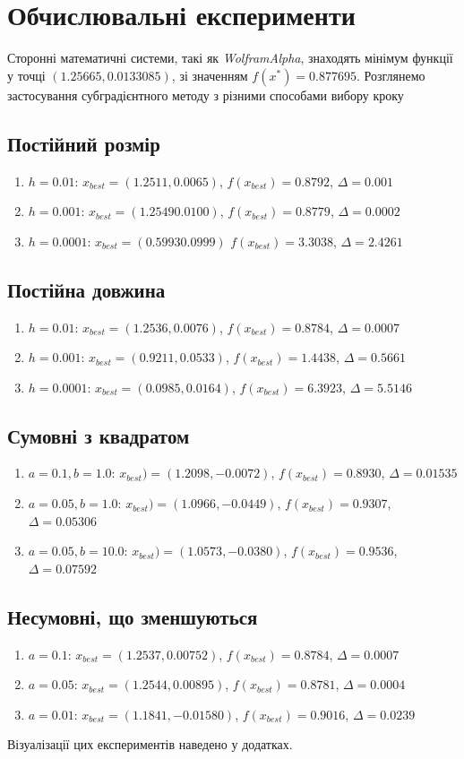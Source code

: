 \documentclass[a4paper, 14pt]{extarticle}
\begin{document}
\section{Обчислювальні експерименти}
Сторонні математичні системи, такі як \emph{WolframAlpha},
знаходять мінімум функції у точці $(1.25665, 0.0133085)$,
зі значенням $f(x^\ast) = 0.877695$.
Розглянемо застосування субградієнтного методу з різними 
способами вибору кроку 
\subsection{Постійний розмір}
\begin{enumerate}
    \item $h=0.01$:  $x_{best} = (1.2511, 0.0065)$, $f(x_{best})=0.8792$, $\varDelta = 0.001$
    \item $h=0.001$: $x_{best} = (1.2549 0.0100)$,  $f(x_{best})= 0.8779$, $\varDelta=0.0002$
    \item $h=0.0001$: $x_{best} = (0.5993 0.0999)$  $f(x_{best})=3.3038$, $\varDelta = 2.4261$
\end{enumerate}
\subsection{Постійна довжина}
\begin{enumerate}
    \item $h=0.01  $:  $x_{best}=(1.2536, 0.0076)$, $f(x_{best})=0.8784$, $\varDelta=0.0007$
    \item $h=0.001 $:  $x_{best}=(0.9211, 0.0533)$, $f(x_{best})=1.4438$, $\varDelta=0.5661$
    \item $h=0.0001$:  $x_{best}=(0.0985, 0.0164)$, $f(x_{best})=6.3923$, $\varDelta=5.5146$
\end{enumerate}
\subsection{Сумовні з квадратом}
\begin{enumerate}
    \item $a=0.1, b=1.0$:   $x_{best})=( 1.2098, -0.0072)$, $f(x_{best})=0.8930$, $\varDelta = 0.01535$
    \item $a=0.05, b=1.0$:  $x_{best})=( 1.0966, -0.0449)$, $f(x_{best})=0.9307$, $\varDelta = 0.05306$
    \item $a=0.05, b=10.0$: $x_{best})=( 1.0573, -0.0380)$, $f(x_{best})=0.9536$, $\varDelta = 0.07592$
\end{enumerate}
\subsection{Несумовні, що зменшуються}
\begin{enumerate}
    \item $a=0.1  $: $x_{best}=(1.2537,  0.00752)$, $f(x_{best})=  0.8784$, $\varDelta= 0.0007$
    \item $a=0.05 $: $x_{best}=(1.2544,  0.00895)$, $f(x_{best})=  0.8781$, $\varDelta= 0.0004$
    \item $a= 0.01$: $x_{best}=(1.1841, -0.01580)$, $f(x_{best})=  0.9016$, $\varDelta= 0.0239$
\end{enumerate}
Візуалізації цих експериментів наведено у додатках.
\end{document}
